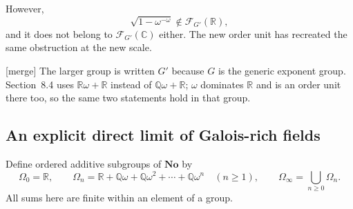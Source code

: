 \documentclass[11pt,letterpaper]{article}
\theoremstyle{definition}
\theoremstyle{remark}
\newcommand{\Q}{\mathbb Q}
\newcommand{\R}{\mathbb R}
\newcommand{\C}{\mathbb C}
\newcommand{\No}{\mathbf{No}}
\newcommand{\FF}[2]{\mathcal F_{#2}(#1)}
\begin{document}
However,
\[
 \sqrt{1-\omega^{-\omega}}\notin\FF{\R}{G'},
\]
and it does not belong to $\FF{\C}{G'}$ either. The new order unit has
recreated the same obstruction at the new scale.

\textup{[merge]} The larger group is written $G'$ because $G$ is the
generic exponent group. Section~8.4 uses $\R\omega+\R$ instead of
$\Q\omega+\R$; $\omega$ dominates $\R$ and is an order unit there too, so
the same two statements hold in that group.

\subsection{An explicit direct limit of Galois-rich fields}

Define ordered additive subgroups of $\No$ by
\[
 \Omega_0=\R,\qquad
 \Omega_n=\R+\Q\omega+\Q\omega^2+\cdots+\Q\omega^n\quad(n\geq1),
 \qquad \Omega_\infty=\bigcup_{n\geq0}\Omega_n.
\]
All sums here are finite within an element of a group.
\end{document}
